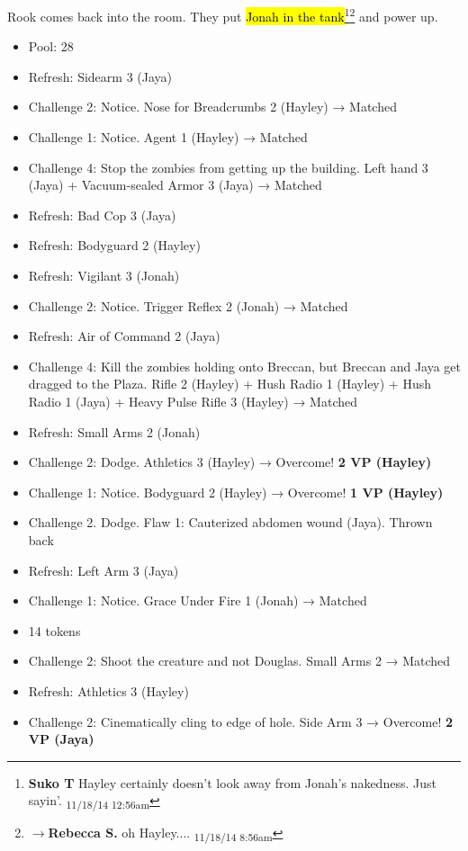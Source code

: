Rook comes back into the room.  They put \hl{Jonah in the tank}\footnote{\textbf{Suko T }Hayley certainly doesn't look away from Jonah's nakedness.  Just sayin'. \textsubscript{11/18/14 12:56am}}\footnote{$\rightarrow$\textbf{Rebecca S. }oh Hayley.... \textsubscript{11/18/14 8:56am}} and power up.  





\begin{itemize}
\item Pool: 28
\item Refresh: Sidearm 3 (Jaya)
\item Challenge 2: Notice.  Nose for Breadcrumbs 2 (Hayley) → Matched
\item Challenge 1: Notice. Agent 1 (Hayley) → Matched
\item Challenge 4: Stop the zombies from getting up the building.  Left hand 3 (Jaya) + Vacuum-sealed Armor 3 (Jaya) → Matched
\item Refresh: Bad Cop 3 (Jaya)
\item Refresh: Bodyguard 2 (Hayley)
\item Refresh: Vigilant 3 (Jonah)
\item Challenge 2: Notice. Trigger Reflex 2 (Jonah) → Matched
\item Refresh: Air of Command 2 (Jaya)
\item Challenge 4: Kill the zombies holding onto Breccan, but Breccan and Jaya get dragged to the Plaza.  Rifle 2 (Hayley) + Hush Radio 1 (Hayley) + Hush Radio 1 (Jaya) + Heavy Pulse Rifle 3 (Hayley) → Matched
\item Refresh: Small Arms 2 (Jonah)
\item Challenge 2: Dodge.  Athletics 3 (Hayley) →  Overcome! \textbf{2 VP (Hayley)}
\item Challenge 1: Notice.  Bodyguard 2 (Hayley) →  Overcome! \textbf{1 VP (Hayley)}
\item Challenge 2. Dodge.   Flaw 1: Cauterized abdomen wound (Jaya).  Thrown back
\item Refresh: Left Arm 3 (Jaya)
\item Challenge 1: Notice.  Grace Under Fire 1 (Jonah) → Matched
\item 14 tokens
\item Challenge 2: Shoot the creature and not Douglas.  Small Arms 2 → Matched
\item Refresh: Athletics 3 (Hayley)
\item Challenge 2: Cinematically cling to edge of hole.  Side Arm 3 →  Overcome! \textbf{2 VP (Jaya)}

\end{itemize}

